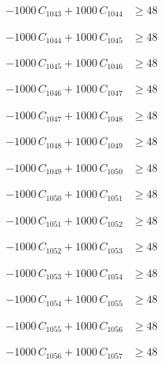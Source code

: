\documentclass[a4paper,11pt]{article}
\begin{document}
\begin{align}
-1000\,C_{1043} + 1000\,C_{1044} &\geq 48 \nonumber
\end{align}

\begin{align}
-1000\,C_{1044} + 1000\,C_{1045} &\geq 48 \nonumber
\end{align}

\begin{align}
-1000\,C_{1045} + 1000\,C_{1046} &\geq 48 \nonumber
\end{align}

\begin{align}
-1000\,C_{1046} + 1000\,C_{1047} &\geq 48 \nonumber
\end{align}

\begin{align}
-1000\,C_{1047} + 1000\,C_{1048} &\geq 48 \nonumber
\end{align}

\begin{align}
-1000\,C_{1048} + 1000\,C_{1049} &\geq 48 \nonumber
\end{align}

\begin{align}
-1000\,C_{1049} + 1000\,C_{1050} &\geq 48 \nonumber
\end{align}

\begin{align}
-1000\,C_{1050} + 1000\,C_{1051} &\geq 48 \nonumber
\end{align}

\begin{align}
-1000\,C_{1051} + 1000\,C_{1052} &\geq 48 \nonumber
\end{align}

\begin{align}
-1000\,C_{1052} + 1000\,C_{1053} &\geq 48 \nonumber
\end{align}

\begin{align}
-1000\,C_{1053} + 1000\,C_{1054} &\geq 48 \nonumber
\end{align}

\begin{align}
-1000\,C_{1054} + 1000\,C_{1055} &\geq 48 \nonumber
\end{align}

\begin{align}
-1000\,C_{1055} + 1000\,C_{1056} &\geq 48 \nonumber
\end{align}

\begin{align}
-1000\,C_{1056} + 1000\,C_{1057} &\geq 48 \nonumber
\end{align}
\end{document}
